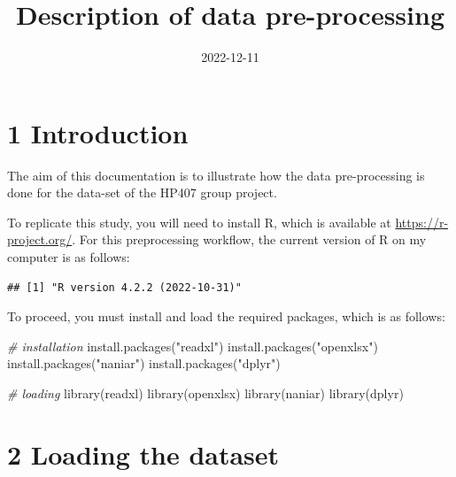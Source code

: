 \documentclass[
]{article}
\title{Description of data pre-processing}
\author{}
\date{\vspace{-2.5em}2022-12-11}
\newenvironment{Shaded}{\begin{snugshade}}{\end{snugshade}}
\newcommand{\CommentTok}[1]{\textcolor[rgb]{0.56,0.35,0.01}{\textit{#1}}}
\newcommand{\FunctionTok}[1]{\textcolor[rgb]{0.00,0.00,0.00}{#1}}
\newcommand{\NormalTok}[1]{#1}
\newcommand{\SpecialCharTok}[1]{\textcolor[rgb]{0.00,0.00,0.00}{#1}}
\newcommand{\StringTok}[1]{\textcolor[rgb]{0.31,0.60,0.02}{#1}}
\begin{document}
\maketitle

\hypertarget{introduction}{%
\section{1 Introduction}\label{introduction}}

The aim of this documentation is to illustrate how the data
pre-processing is done for the data-set of the HP407 group project.

To replicate this study, you will need to install R, which is available
at \url{https://r-project.org/}. For this preprocessing workflow, the
current version of R on my computer is as follows:

\begin{Shaded}
\end{Shaded}

\begin{verbatim}
## [1] "R version 4.2.2 (2022-10-31)"
\end{verbatim}

To proceed, you must install and load the required packages, which is as
follows:

\begin{Shaded}
\begin{Highlighting}[]
\CommentTok{\# installation}
\FunctionTok{install.packages}\NormalTok{(}\StringTok{"readxl"}\NormalTok{)}
\FunctionTok{install.packages}\NormalTok{(}\StringTok{"openxlsx"}\NormalTok{)}
\FunctionTok{install.packages}\NormalTok{(}\StringTok{"naniar"}\NormalTok{)}
\FunctionTok{install.packages}\NormalTok{(}\StringTok{"dplyr"}\NormalTok{)}

\CommentTok{\# loading}
\FunctionTok{library}\NormalTok{(readxl)}
\FunctionTok{library}\NormalTok{(openxlsx)}
\FunctionTok{library}\NormalTok{(naniar)}
\FunctionTok{library}\NormalTok{(dplyr)}
\end{Highlighting}
\end{Shaded}

\hypertarget{loading-the-dataset}{%
\section{2 Loading the dataset}\label{loading-the-dataset}}
\end{document}
